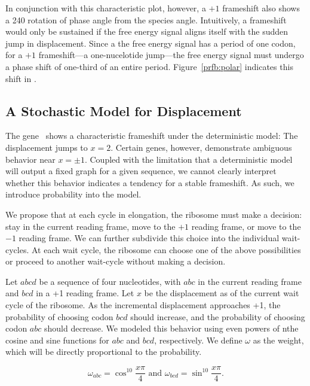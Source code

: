 \documentclass[12pt, draft]{article}
\numberwithin{equation}{section}
\begin{document}
In conjunction with this characteristic plot, however, a $+1$ frameshift also shows a 240\degree
rotation of phase angle from the species angle.
Intuitively, a frameshift would only be sustained if the free energy signal aligns itself with the sudden jump in displacement.
Since a the free energy signal has a period of one codon, for a $+1$ frameshift---a one-nucelotide jump---the free energy signal
must undergo a phase shift of one-third of an entire period.  Figure~\ref{prfb:polar} indicates this shift in \prfB.

\subsection{A Stochastic Model for Displacement}


The gene \prfB\ shows a characteristic frameshift under the deterministic model: The displacement jumps to $x=2$.
Certain genes, however, demonstrate ambiguous behavior near $x = \pm 1$.
Coupled with the limitation that a deterministic model will output a fixed graph for a given sequence, 
we cannot clearly interpret whether this behavior indicates a tendency for a stable frameshift.
As such, we introduce probability into the model.

We propose that at each cycle in elongation, the ribosome must make a decision: stay in the current reading frame,
move to the $+1$ reading frame,
or move to the $-1$ reading frame.  We can further subdivide this choice into the individual wait-cycles.
At each wait cycle, the ribosome can choose one of the above possibilities or proceed to another wait-cycle without making a decision.

Let $abcd$ be a sequence of four nucleotides, with $abc$ in the
current reading frame and $bcd$ in a +1 reading frame.  Let $x$ be the
displacement as of the current wait cycle of the ribosome.  As the
incremental displacement approaches +1, the probability of choosing
codon $bcd$ should increase, and the probability of choosing codon
$abc$ should decrease.  We modeled this behavior using even powers of
nthe cosine and sine functions for $abc$ and $bcd$, respectively.  We
define $\omega$ as the weight, which will be directly proportional to
the probability.

\begin{equation}
  \omega_{abc} = \cos^{10}{\frac{x\pi}{4}} \text{ and } \omega_{bcd} = \sin^{10}{\frac{x\pi}{4}}.
\end{equation}
\end{document}
